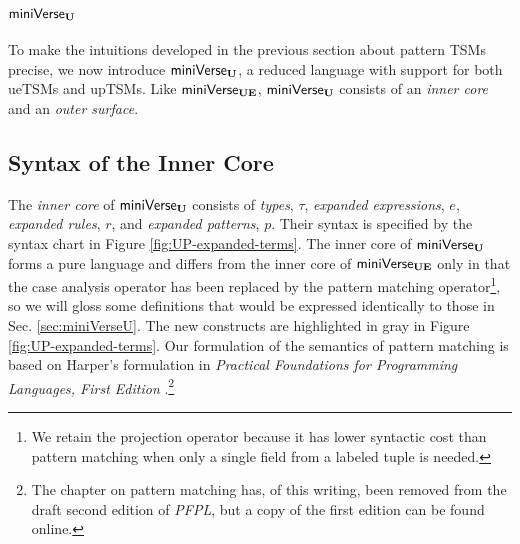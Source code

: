 {{{{\section{\texorpdfstring{$\mathsf{miniVerse}_\textbf{U}$}{miniVerseU}}\label{sec:miniVerseUP}
To make the intuitions developed in the previous section about pattern TSMs precise, we  now introduce $\mathsf{miniVerse}_\textbf{U}$, a reduced language with support for both ueTSMs and upTSMs. Like $\mathsf{miniVerse}_\textbf{UE}$, $\mathsf{miniVerse}_\textbf{U}$ consists of an \emph{inner core} and an \emph{outer surface}.

\subsection{Syntax of the Inner Core}\label{sec:UP-expanded-terms}
The \emph{inner core} of $\mathsf{miniVerse}_\textbf{U}$ consists of \emph{types}, $\tau$, \emph{expanded expressions}, $e$, \emph{expanded rules}, $r$, and \emph{expanded patterns}, $p$. Their syntax is specified by the syntax chart in Figure \ref{fig:UP-expanded-terms}. The inner core of $\mathsf{miniVerse}_\textbf{U}$ forms a pure language and differs from the inner core of $\mathsf{miniVerse}_\textbf{UE}$  only in that the case analysis operator has been replaced by the pattern matching operator\footnote{We retain the projection operator because it has lower syntactic cost than pattern matching when only a single field from a labeled tuple is needed.}, so we will gloss some definitions that would be expressed identically to those in Sec. \ref{sec:miniVerseU}. The new constructs are highlighted in gray in Figure \ref{fig:UP-expanded-terms}. Our formulation of the semantics of pattern matching is based on Harper's formulation in \emph{Practical Foundations for Programming Languages, First Edition} \cite{pfple1}.\footnote{The chapter on pattern matching has, of this writing, been removed from the draft second edition of \emph{PFPL}, but a copy of the first edition can be found online.}

}}}}
